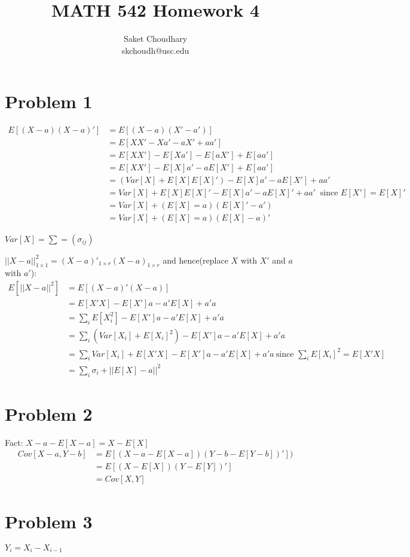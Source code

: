 \documentclass[a4paper]{article}
\title{MATH 542 Homework 4}
\author{Saket Choudhary\\skchoudh@usc.edu}
\begin{document}
\maketitle 
\section*{Problem 1}

\begin{align*}
E[(X-a)(X-a)']&= E[(X-a)(X'-a')]\\
&= E[XX'-Xa'-aX'+aa']\\
&= E[XX']-E[Xa']-E[aX']+E[aa']\\
&= E[XX']-E[X]a'-aE[X']+E[aa']\\
&= (Var[X]+E[X]E[X]')-E[X]a'-aE[X']+aa'\\
&= Var[X]+ E[X]E[X]'-E[X]a'-aE[X]'+aa'\ \text{ since } E[X']=E[X]'\\
&= Var[X] + (E[X]=a)(E[X]'-a')\\
&= Var[X] + (E[X]=a)(E[X]-a)'
\end{align*}

$Var[X] = \sum = (\sigma_{ij})$

$||X-a||_{1\times 1}^2 = (X-a)'_{1 \times r}(X-a)_{1 \times r}$
and hence(replace $X$ with $X'$ and $a$ with $a'$):
\begin{align*}
E[||X-a||^2] &= E[(X-a)'(X-a)]\\
&= E[X'X]-E[X']a-a'E[X]+a'a\\
&= \sum_i E[X_i^2]-E[X']a-a'E[X]+a'a\\
&= \sum_i (Var[X_i]+E[X_i]^2)-E[X']a-a'E[X]+a'a\\
&= \sum_i Var[X_i]+ E[X'X]-E[X']a-a'E[X]+a'a\ \text{since } \sum_i E[X_i]^2 = E[X'X]\\
&= \sum_i \sigma_i + ||E[X]-a||^2
\end{align*}

\section{Problem 2}
Fact: $X-a-E[X-a]=X-E[X]$
\begin{align*}
Cov[X-a,Y-b] &= E[(X-a-E[X-a])(Y-b-E[Y-b])'])\\
&= E[(X-E[X])(Y-E[Y])']\\
&= Cov[X,Y]
\end{align*}

\section{Problem 3}
$Y_i = X_i-X_{i-1}$
\end{document}
